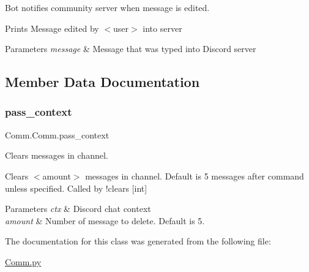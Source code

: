 Bot notifies community server when message is edited. 

Prints \textquotesingle{}Message edited by $<$user$>$\textquotesingle{} into server 
\begin{DoxyParams}{Parameters}
{\em message} & Message that was typed into Discord server \\
\hline
\end{DoxyParams}


\subsection{Member Data Documentation}
\mbox{\label{class_comm_1_1_comm_a29104131fc8568f962827432fb1bab82}} 
\subsubsection{\texorpdfstring{pass\+\_\+context}{pass\_context}}
{\footnotesize\ttfamily Comm.\+Comm.\+pass\+\_\+context\hspace{0.3cm}{\ttfamily [static]}}



Clears messages in channel. 

Clears $<$amount$>$ messages in channel. Default is 5 messages after command unless specified. Called by !clears \mbox{[}int\mbox{]} 
\begin{DoxyParams}{Parameters}
{\em ctx} & Discord chat context \\
\hline
{\em amount} & Number of message to delete. Default is 5. \\
\hline
\end{DoxyParams}


The documentation for this class was generated from the following file\+:\begin{DoxyCompactItemize}
\item 
\mbox{\hyperlink{_comm_8py}{Comm.\+py}}\end{DoxyCompactItemize}
